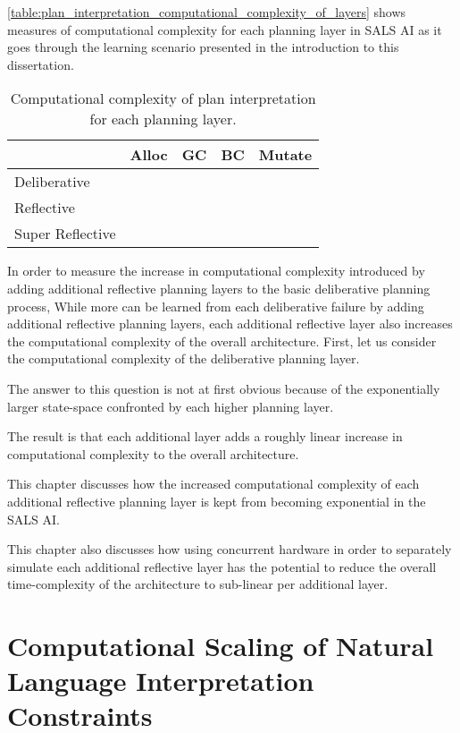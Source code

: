 {\mbox{\autoref{table:plan_interpretation_computational_complexity_of_layers}}}
shows measures of computational complexity for each planning layer in
SALS AI as it goes through the learning scenario presented in the
introduction to this dissertation.
\begin{table}
\centering
\begin{tabular}{|l|l|l|l|l|}
\hline
                 &Alloc &GC &BC &Mutate \\
\hline
Deliberative     &      &   &   &       \\
\hline
Reflective       &      &   &   &       \\
\hline
Super Reflective &      &   &   &       \\
\hline
\end{tabular}
\caption{Computational complexity of plan interpretation for each
  planning layer.}
\label{table:plan_interpretation_computational_complexity_of_layers}
\end{table}
In order to measure the increase in computational complexity
introduced by adding additional reflective planning layers to the
basic deliberative planning process,   While more can be learned from
each deliberative failure by adding additional reflective planning
layers, each additional reflective layer also increases the
computational complexity of the overall architecture.  First, let us
consider the computational complexity of the deliberative planning
layer.

The answer to this question is not at first obvious because of the
exponentially larger state-space confronted by each higher planning
layer.

The result is that each additional layer adds a roughly linear
increase in computational complexity to the overall architecture.

This chapter discusses how the increased computational complexity of
each additional reflective planning layer is kept from becoming
exponential in the SALS AI.

This chapter also discusses how using concurrent hardware in order to
separately simulate each additional reflective layer has the potential
to reduce the overall time-complexity of the architecture to
sub-linear per additional layer.

\section{Computational Scaling of Natural Language Interpretation Constraints}

